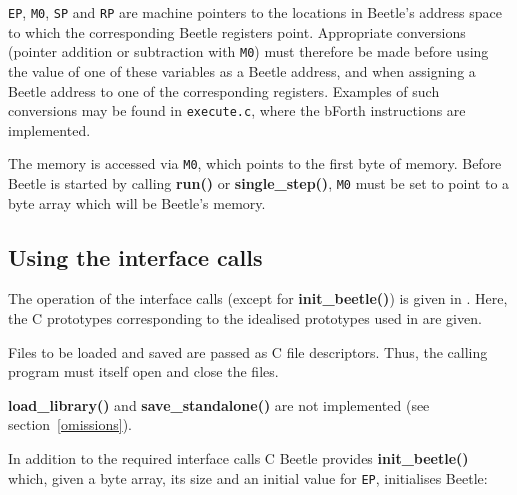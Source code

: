 {\tt EP}, {\tt M0}, {\tt SP} and {\tt RP} are machine pointers to the
locations in Beetle's address space to which the corresponding Beetle
registers point. Appropriate conversions (pointer addition or subtraction
with {\tt M0}) must therefore be made before using the value of one of these
variables as a Beetle address, and when assigning a Beetle address to one of
the corresponding registers. Examples of such conversions may be found in
{\tt execute.c}, where the bForth instructions are implemented.

The memory is accessed via {\tt M0}, which points to the first byte of
memory. Before Beetle is started by calling {\bf run()} or {\bf
single\_step()}, {\tt M0} must be set to point to a byte array which will be
Beetle's memory.


\subsection{Using the interface calls}
\label{usingcalls}

The operation of the interface calls (except for {\bf init\_beetle()}) is
given in \cite{beetledis}. Here, the C prototypes corresponding to the idealised
prototypes used in \cite{beetledis} are given.

Files to be loaded and saved are passed as C file descriptors. Thus, the
calling program must itself open and close the files.

\begin{description}
\end{description}

{\bf load\_library()} and {\bf save\_standalone()} are not implemented (see
section~\ref{omissions}).

In addition to the required interface calls C Beetle provides {\bf
init\_beetle()} which, given a byte array, its size and an initial value for
{\tt EP}, initialises Beetle:

\begin{description}
\end{description}

